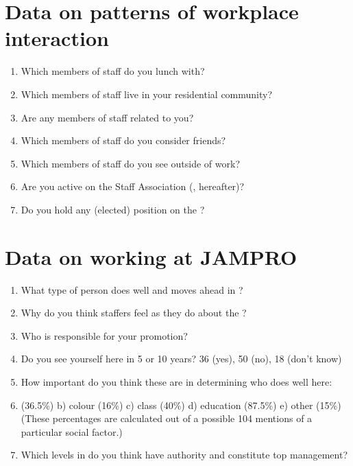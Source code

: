 \section{Data on patterns of workplace interaction}
\begin{enumerate}
\item Which members of staff do you lunch with?
\item Which members of staff live in your residential community?
\item Are any members of staff related to you?
\item Which members of staff do you consider friends?
\item Which members of staff do you see outside of work?
\item Are you active on the Staff Association (, hereafter)?
\item Do you hold any (elected) position on the ?
\end{enumerate}

\section{Data on working at JAMPRO}
\begin{enumerate}
\item What type of person does well and moves ahead in ?
\item Why do you think staffers feel as they do about the ?
\item Who is responsible for your promotion?
\item Do you see yourself here in 5 or 10 years? 36 (yes), 50 (no), 18 (don’t know)
\item How important do you think these are in determining who does well here:
\item {} (36.5\%)     b) colour (16\%)     c) class (40\%)      d) education (87.5\%)     e) other (15\%) (These percentages are calculated out of a possible 104 mentions of a particular social factor.)
\item Which levels in  do you think have authority and constitute top management?
\end{enumerate}
